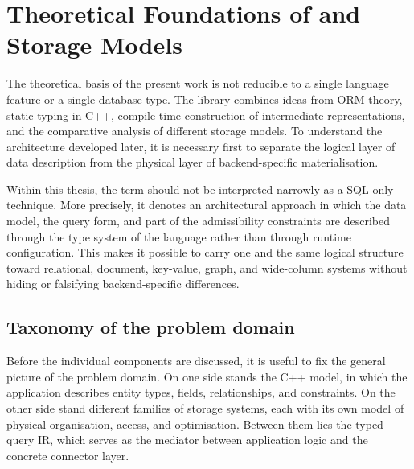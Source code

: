 \section{Theoretical Foundations of \ORMName{} and Storage Models}
\label{sec:theoretical_background}

The theoretical basis of the present work is not reducible to a single language feature or a single database type. The library combines ideas from ORM theory, static typing in C++, compile-time construction of intermediate representations, and the comparative analysis of different storage models. To understand the architecture developed later, it is necessary first to separate the logical layer of data description from the physical layer of backend-specific materialisation.

Within this thesis, the term \ORMName{} should not be interpreted narrowly as a SQL-only technique. More precisely, it denotes an architectural approach in which the data model, the query form, and part of the admissibility constraints are described through the type system of the language rather than through runtime configuration. This makes it possible to carry one and the same logical structure toward relational, document, key-value, graph, and wide-column systems without hiding or falsifying backend-specific differences.

\subsection{Taxonomy of the problem domain}

Before the individual components are discussed, it is useful to fix the general picture of the problem domain. On one side stands the C++ model, in which the application describes entity types, fields, relationships, and constraints. On the other side stand different families of storage systems, each with its own model of physical organisation, access, and optimisation. Between them lies the typed query IR, which serves as the mediator between application logic and the concrete connector layer.

